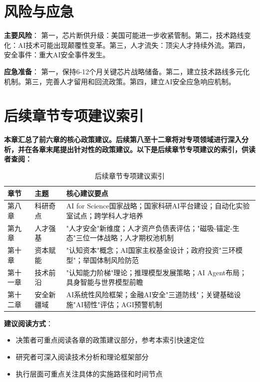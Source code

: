 \section{风险与应急}

\textbf{主要风险}：
第一，芯片断供升级：美国可能进一步收紧管制。第二，技术路线变化：AI技术可能出现颠覆性变革。第三，人才流失：顶尖人才持续外流。第四，安全事件：重大AI安全事件发生。

\textbf{应急准备}：
第一，保持6-12个月关键芯片战略储备。第二，建立技术路线多元化机制。第三，完善人才留用和回流政策。第四，建立AI安全应急响应机制。

\section{后续章节专项建议索引}

\textbf{本章汇总了前六章的核心政策建议。后续第八至十二章将对专项领域进行深入分析，并在各章末尾提出针对性的政策建议。以下是后续章节专项建议的索引，供读者查阅：}

\begin{table}[H]
\centering
\caption{后续章节专项建议索引}
\small
\begin{tabular}{p{1.5cm}p{3.5cm}p{7.5cm}}
\toprule
\textbf{章节} & \textbf{主题} & \textbf{核心建议要点} \\
\midrule
第八章 & 科研奇点 & AI for Science国家战略；国家科研AI平台建设；自动化实验室试点；跨学科人才培养 \\
\midrule
第九章 & 人才强基 & "人才安全"新维度；人才资产负债表评估；"磁吸-锚定-生态"三位一体战略；人才期权池机制 \\
\midrule
第十章 & 资本赋能 & "认知资本"概念；AI国家主权基金设计；政府投资"三环模型"；举国体制风险防范 \\
\midrule
第十一章 & 技术前沿 & "认知能力阶梯"理论；推理模型发展策略；AI Agent布局；具身智能与世界模型前瞻 \\
\midrule
第十二章 & 安全新疆域 & AI系统性风险框架；金融AI安全"三道防线"；关键基础设施"AI韧性"评估；AGI预警机制 \\
\bottomrule
\end{tabular}
\end{table}

\textbf{建议阅读方式}：
\begin{itemize}
\item 决策者可重点阅读各章的政策建议部分，参考本索引快速定位
\item 研究者可深入阅读技术分析和理论框架部分
\item 执行层面可重点关注具体的实施路径和时间节点
\end{itemize}

